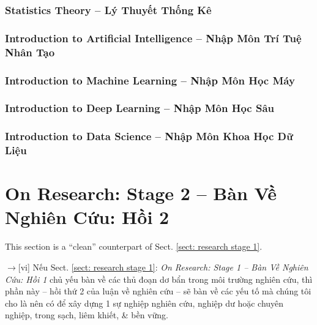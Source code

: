 \documentclass[12pt,twoside]{book}
\begin{document}
\subsection{Statistics Theory -- Lý Thuyết Thống Kê}


\subsection{Introduction to Artificial Intelligence -- Nhập Môn Trí Tuệ Nhân Tạo}


\subsection{Introduction to Machine Learning -- Nhập Môn Học Máy}


\subsection{Introduction to Deep Learning -- Nhập Môn Học Sâu}


\subsection{Introduction to Data Science -- Nhập Môn Khoa Học Dữ Liệu}


\chapter{On Research: Stage 2 -- Bàn Về Nghiên Cứu: Hồi 2}
\label{sect: research stage 2}
\minitoc
This section is a ``clean'' counterpart of Sect. \ref{sect: research stage 1}.

{\sf[en]$\to$[vi]} Nếu Sect. \ref{sect: research stage 1}: {\it On Research: Stage 1 -- Bàn Về Nghiên Cứu: Hồi 1} chủ yếu bàn về các thủ đoạn dơ bẩn trong môi trường nghiên cứu, thì phần này -- hồi thứ 2 của luận về nghiên cứu -- sẽ bàn về các yếu tố mà chúng tôi cho là nên có để xây dựng 1 sự nghiệp nghiên cứu, nghiệp dư hoặc chuyên nghiệp, trong sạch, liêm khiết, \& bền vững.
\end{document}
